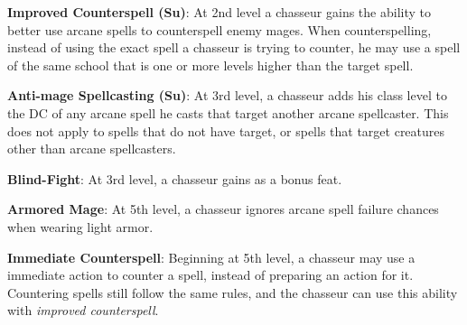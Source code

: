 {\textbf{Improved Counterspell (Su)}: At 2nd level a chasseur gains the ability to better use arcane spells to counterspell enemy mages. When counterspelling, instead of using the exact spell a chasseur is trying to counter, he may use a spell of the same school that is one or more levels higher than the target spell.

\textbf{Anti-mage Spellcasting (Su)}: At 3rd level, a chasseur adds his class level to the DC of any arcane spell he casts that target another arcane spellcaster. This does not apply to spells that do not have target, or spells that target creatures other than arcane spellcasters.

\textbf{Blind-Fight}: At 3rd level, a chasseur gains  as a bonus feat.

\textbf{Armored Mage}: At 5th level, a chasseur ignores arcane spell failure chances when wearing light armor.

\textbf{Immediate Counterspell}: Beginning at 5th level, a chasseur may use a immediate action to counter a spell, instead of preparing an action for it. Countering spells still follow the same rules, and the chasseur can use this ability with \emph{improved counterspell}.
}
